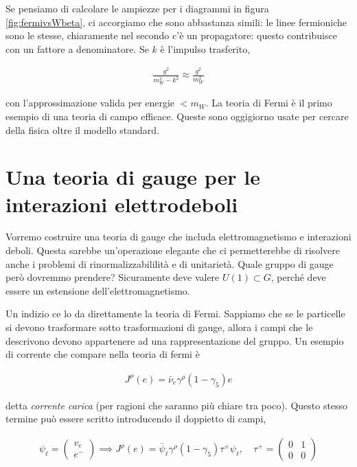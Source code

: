 \documentclass[11pt]{report}
\begin{document}
Se pensiamo di calcolare le ampiezze per i diagrammi in figura \ref{fig:fermivsWbeta}, ci accorgiamo che sono abbastanza simili: le linee fermioniche sono le stesse, chiaramente nel secondo c'è un propagatore: questo contribuisce con un fattore a denominatore. Se \(k\) è l'impulso trasferito, 

\begin{align}
    \frac{g^2}{m^2_W - k^2} \approx \frac{g^2}{m_W^2}
\end{align}

con l'approssimazione valida per energie \(< m_W\). La teoria di Fermi è il primo esempio di una teoria di campo efficace. Queste sono oggigiorno usate per cercare della fisica oltre il modello standard. 

\section{Una teoria di gauge per le interazioni elettrodeboli}

Vorremo costruire una teoria di gauge che includa elettromagnetismo e interazioni deboli. Questa sarebbe un'operazione elegante che ci permetterebbe di risolvere anche i problemi di rinormalizzabililità e di unitarietà. Quale gruppo di gauge però dovremmo prendere? Sicuramente deve valere \(U(1) \subset G\), perché deve essere un estensione dell'elettromagnetismo. 

Un indizio ce lo da direttamente la teoria di Fermi. Sappiamo che se le particelle si devono trasformare sotto trasformazioni di gauge, allora i campi che le descrivono devono appartenere ad una rappresentazione del gruppo. Un esempio di corrente che compare nella teoria di fermi è 

\begin{align}
    J^\rho(e) = \bar{\nu}_e \gamma^\rho (1-\gamma_5) e 
\end{align}

detta \emph{corrente carica} (per ragioni che saranno più chiare tra poco). Questo stesso termine può essere scritto introducendo il doppietto di campi, 

\begin{align}
    \psi_\ell = \begin{pmatrix}
        v_e \\ e^-
    \end{pmatrix} \implies J^\rho(e) = \bar{\psi}_\ell \gamma^\rho (1-\gamma_5)\tau^+ \psi_\ell, \quad \tau^+ = \begin{pmatrix}
        0 & 1 \\ 0 & 0 
    \end{pmatrix}
\end{align}
\end{document}

